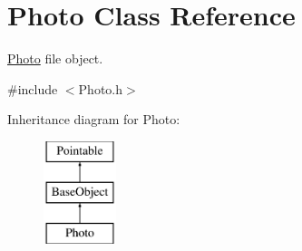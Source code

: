 \hypertarget{classPhoto}{\section{Photo Class Reference}
\label{classPhoto}
}


\hyperlink{classPhoto}{Photo} file object.  




{\ttfamily \#include $<$Photo.\-h$>$}

Inheritance diagram for Photo\-:\begin{figure}[H]
\begin{center}
\leavevmode
\includegraphics[height=3.000000cm]{classPhoto}
\end{center}
\end{figure}
